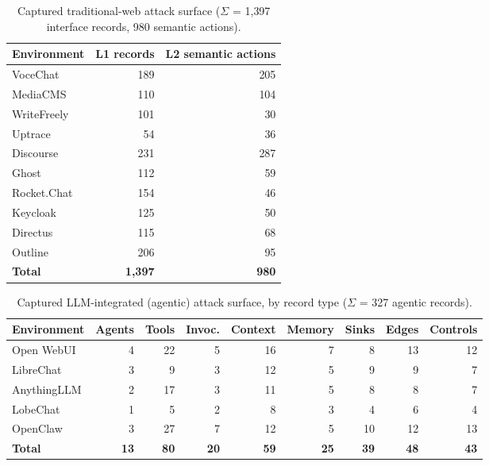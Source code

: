 \documentclass[11pt,a4paper]{article}
\begin{document}
\begin{table}[ht]\centering\small
\caption{Captured traditional-web attack surface ($\Sigma$ = 1{,}397 interface records,
980 semantic actions).}\label{tab:resweb}
\begin{tabular}{@{}lrr@{}}
\toprule
\textbf{Environment} & \textbf{L1 records} & \textbf{L2 semantic actions}\\
\midrule
VoceChat    & 189 & 205\\
MediaCMS    & 110 & 104\\
WriteFreely & 101 &  30\\
Uptrace     &  54 &  36\\
Discourse   & 231 & 287\\
Ghost       & 112 &  59\\
Rocket.Chat & 154 &  46\\
Keycloak    & 125 &  50\\
Directus    & 115 &  68\\
Outline     & 206 &  95\\
\midrule
\textbf{Total} & \textbf{1{,}397} & \textbf{980}\\
\bottomrule
\end{tabular}
\end{table}

\begin{table}[ht]\centering\small
\caption{Captured LLM-integrated (agentic) attack surface, by record type
($\Sigma$ = 327 agentic records).}\label{tab:resllm}
\begin{tabular}{@{}lrrrrrrrr@{}}
\toprule
\textbf{Environment} & \textbf{Agents} & \textbf{Tools} & \textbf{Invoc.} &
\textbf{Context} & \textbf{Memory} & \textbf{Sinks} & \textbf{Edges} & \textbf{Controls}\\
\midrule
Open WebUI  & 4 & 22 & 5 & 16 & 7 &  8 & 13 & 12\\
LibreChat   & 3 &  9 & 3 & 12 & 5 &  9 &  9 &  7\\
AnythingLLM & 2 & 17 & 3 & 11 & 5 &  8 &  8 &  7\\
LobeChat    & 1 &  5 & 2 &  8 & 3 &  4 &  6 &  4\\
OpenClaw    & 3 & 27 & 7 & 12 & 5 & 10 & 12 & 13\\
\midrule
\textbf{Total} & \textbf{13} & \textbf{80} & \textbf{20} & \textbf{59} & \textbf{25}
& \textbf{39} & \textbf{48} & \textbf{43}\\
\bottomrule
\end{tabular}
\end{table}
\end{document}
